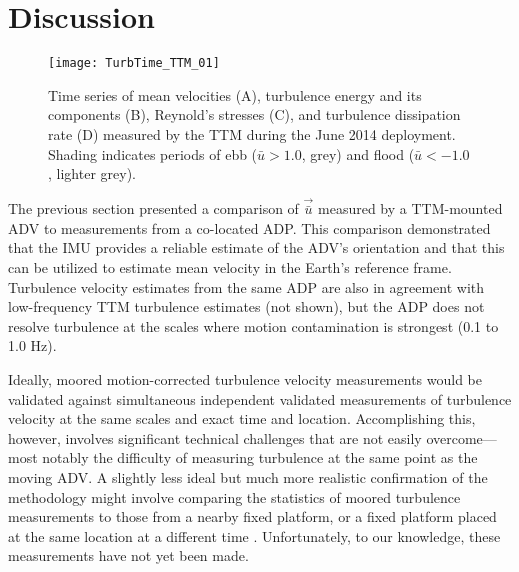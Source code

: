 
\section{Discussion}
\label{sec:discussion}

\begin{figure*}[t]
  \centering
  \texttt{[image: TurbTime\_TTM\_01]}
  \caption{Time series of mean velocities (A), turbulence energy and its components (B), Reynold's stresses (C), and turbulence dissipation rate (D) measured by the TTM during the June 2014 deployment. Shading indicates periods of ebb ($\bar{u}>1.0$, grey) and flood ($\bar{u}<-1.0$, lighter grey).}
  \label{fig:turbtime:ttm}
\end{figure*}

The previous section presented a comparison of $\vec{\bar{u}}$ measured by a TTM-mounted ADV to measurements from a co-located ADP. This comparison demonstrated that the IMU provides a reliable estimate of the ADV's orientation and that this can be utilized to estimate mean velocity in the Earth's reference frame. Turbulence velocity estimates from the same ADP are also in agreement with low-frequency TTM turbulence estimates (not shown), but the ADP does not resolve turbulence at the scales where motion contamination is strongest (0.1 to 1.0 Hz).

Ideally, moored motion-corrected turbulence velocity measurements would be validated against simultaneous independent validated measurements of turbulence velocity at the same scales and exact time and location. Accomplishing this, however, involves significant technical challenges that are not easily overcome---most notably the difficulty of measuring turbulence at the same point as the moving ADV. A slightly less ideal but much more realistic confirmation of the methodology might involve comparing the statistics of moored turbulence measurements to those from a nearby fixed platform, or a fixed platform placed at the same location at a different time \cite[e.g., the ``TTT" platform described in][]{Thomson++2012}. Unfortunately, to our knowledge, these measurements have not yet been made.

